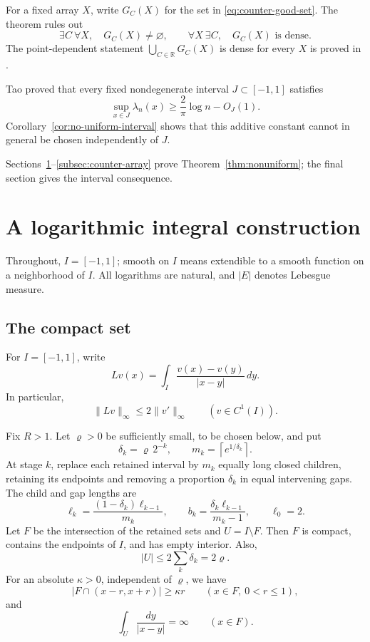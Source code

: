 \documentclass[11pt]{article}
\theoremstyle{remark}
\numberwithin{equation}{section}
\newcommand{\R}{\mathbb R}
\begin{document}
For a fixed array \(X\), write \(G_C(X)\) for the set in
\eqref{eq:counter-good-set}. The theorem rules out
\[
 \exists C\ \forall X,\quad G_C(X)\ne\varnothing,
 \qquad
 \forall X\ \exists C,\quad G_C(X)\text{ is dense}.
\]
The point-dependent statement
\(\bigcup_{C\in\R}G_C(X)\) is dense for every \(X\)
is proved in \cite[Theorem~1(i)]{GuPointwise}.

Tao \cite[Theorem~1.10(i)]{Tao} proved that every fixed nondegenerate
interval \(J\subset[-1,1]\) satisfies
\[
 \sup_{x\in J}\lambda_n(x)\ge\frac2\pi\log n-O_J(1).
\]
Corollary~\ref{cor:no-uniform-interval} shows that this additive
constant cannot in general be chosen independently of \(J\).

Sections~\ref{sec:counterexample}--\ref{subsec:counter-array} prove
Theorem~\ref{thm:nonuniform}; the final section gives the interval
consequence.

\section{A logarithmic integral construction}
\label{sec:counterexample}

Throughout, \(I=[-1,1]\); smooth on \(I\) means extendible to a
smooth function on a neighborhood of \(I\).
All logarithms are natural, and \(|E|\) denotes Lebesgue measure.

\subsection{The compact set}\label{subsec:counter-set}

For \(I=[-1,1]\), write
\[
 Lv(x)=\int_I\frac{v(x)-v(y)}{|x-y|}\,dy.
\]
In particular,
\begin{equation}\label{eq:counter-u3}
 \|Lv\|_\infty\le2\|v'\|_\infty\qquad(v\in C^1(I)).
\end{equation}

Fix \(R>1\). Let \(\varrho>0\) be sufficiently small, to be chosen
below, and put
\[
 \delta_k=\varrho\,2^{-k},\qquad
 m_k=\left\lceil e^{1/\delta_k}\right\rceil.
\]
At stage \(k\), replace each retained interval by \(m_k\) equally long
closed children, retaining its endpoints and removing a proportion
\(\delta_k\) in equal intervening gaps. The child and gap lengths are
\[
 \ell_k=\frac{(1-\delta_k)\ell_{k-1}}{m_k},\qquad
 b_k=\frac{\delta_k\ell_{k-1}}{m_k-1},\qquad \ell_0=2.
\]
Let \(F\) be the intersection of the retained sets and \(U=I\setminus F\).
Then \(F\) is compact, contains the endpoints of \(I\), and has empty
interior. Also,
\[
 |U|\le2\sum_k\delta_k=2\varrho.
\]
For an absolute \(\kappa>0\), independent of \(\varrho\), we have
\begin{equation}\label{eq:counter-u5}
 |F\cap(x-r,x+r)|\ge\kappa r
 \qquad(x\in F,\ 0<r\le1),
\end{equation}
and
\begin{equation}\label{eq:counter-u6}
 \int_U\frac{dy}{|x-y|}=\infty\qquad(x\in F).
\end{equation}
\end{document}
